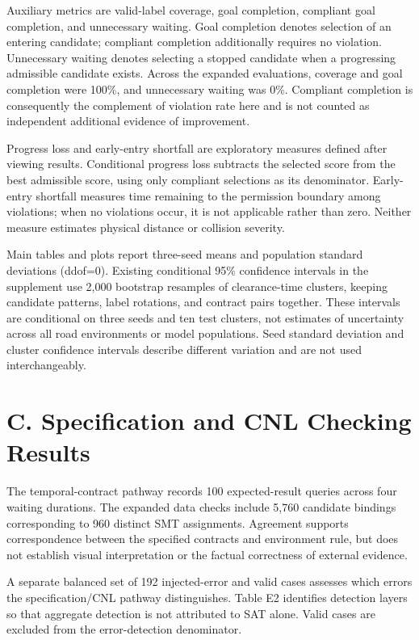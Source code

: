 \documentclass[11pt,a4paper]{article}
\begin{document}
Auxiliary metrics are valid-label coverage, goal completion, compliant goal completion, and unnecessary waiting. Goal completion denotes selection of an entering candidate; compliant completion additionally requires no violation. Unnecessary waiting denotes selecting a stopped candidate when a progressing admissible candidate exists. Across the expanded evaluations, coverage and goal completion were 100\%, and unnecessary waiting was 0\%. Compliant completion is consequently the complement of violation rate here and is not counted as independent additional evidence of improvement.\par

Progress loss and early-entry shortfall are exploratory measures defined after viewing results. Conditional progress loss subtracts the selected score from the best admissible score, using only compliant selections as its denominator. Early-entry shortfall measures time remaining to the permission boundary among violations; when no violations occur, it is not applicable rather than zero. Neither measure estimates physical distance or collision severity.\par

Main tables and plots report three-seed means and population standard deviations (ddof=0). Existing conditional 95\% confidence intervals in the supplement use 2,000 bootstrap resamples of clearance-time clusters, keeping candidate patterns, label rotations, and contract pairs together. These intervals are conditional on three seeds and ten test clusters, not estimates of uncertainty across all road environments or model populations. Seed standard deviation and cluster confidence intervals describe different variation and are not used interchangeably.\par

\section*{C. Specification and CNL Checking Results}

The temporal-contract pathway records 100 expected-result queries across four waiting durations. The expanded data checks include 5,760 candidate bindings corresponding to 960 distinct SMT assignments. Agreement supports correspondence between the specified contracts and environment rule, but does not establish visual interpretation or the factual correctness of external evidence.\par

A separate balanced set of 192 injected-error and valid cases assesses which errors the specification/CNL pathway distinguishes. Table E2 identifies detection layers so that aggregate detection is not attributed to SAT alone. Valid cases are excluded from the error-detection denominator.\par
\end{document}
